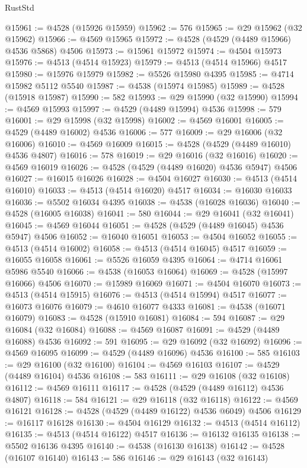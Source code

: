 \begin{lexlean}{RustStd}
\begin{coremodule}
@15961 := @4528 (@15926 @15959)
@15962 := 576
@15965 := @29 @15962 (@32 @15962)
@15966 := @4569 @15965
@15972 := @4528 (@4529 (@4489 @15966) @4536 @5868) @4506
@15973 := @15961 @15972
@15974 := @4504 @15973
@15976 := @4513 (@4514 @15923)
@15979 := @4513 (@4514 @15966) @4517
@15980 := @15976 @15979
@15982 := @5526 @15980 @4395
@15985 := @4714 @15982 @5112 @5540
@15987 := @4538 (@15974 @15985)
@15989 := @4528 (@15918 @15987)
@15990 := 582
@15993 := @29 @15990 (@32 @15990)
@15994 := @4569 @15993
@15997 := @4529 (@4489 @15994) @4536
@15998 := 579
@16001 := @29 @15998 (@32 @15998)
@16002 := @4569 @16001
@16005 := @4529 (@4489 @16002) @4536
@16006 := 577
@16009 := @29 @16006 (@32 @16006)
@16010 := @4569 @16009
@16015 := @4528 (@4529 (@4489 @16010) @4536 @4807)
@16016 := 578
@16019 := @29 @16016 (@32 @16016)
@16020 := @4569 @16019
@16026 := @4528 (@4529 (@4489 @16020) @4536 @5947) @4506
@16027 := @16015 @16026
@16028 := @4504 @16027
@16030 := @4513 (@4514 @16010)
@16033 := @4513 (@4514 @16020) @4517
@16034 := @16030 @16033
@16036 := @5502 @16034 @4395
@16038 := @4538 (@16028 @16036)
@16040 := @4528 (@16005 @16038)
@16041 := 580
@16044 := @29 @16041 (@32 @16041)
@16045 := @4569 @16044
@16051 := @4528 (@4529 (@4489 @16045) @4536 @5947) @4506
@16052 := @16040 @16051
@16053 := @4504 @16052
@16055 := @4513 (@4514 @16002)
@16058 := @4513 (@4514 @16045) @4517
@16059 := @16055 @16058
@16061 := @5526 @16059 @4395
@16064 := @4714 @16061 @5986 @5540
@16066 := @4538 (@16053 @16064)
@16069 := @4528 (@15997 @16066) @4506
@16070 := @15989 @16069
@16071 := @4504 @16070
@16073 := @4513 (@4514 @15915)
@16076 := @4513 (@4514 @15994) @4517
@16077 := @16073 @16076
@16079 := @4610 @16077 @4333
@16081 := @4538 (@16071 @16079)
@16083 := @4528 (@15910 @16081)
@16084 := 594
@16087 := @29 @16084 (@32 @16084)
@16088 := @4569 @16087
@16091 := @4529 (@4489 @16088) @4536
@16092 := 591
@16095 := @29 @16092 (@32 @16092)
@16096 := @4569 @16095
@16099 := @4529 (@4489 @16096) @4536
@16100 := 585
@16103 := @29 @16100 (@32 @16100)
@16104 := @4569 @16103
@16107 := @4529 (@4489 @16104) @4536
@16108 := 583
@16111 := @29 @16108 (@32 @16108)
@16112 := @4569 @16111
@16117 := @4528 (@4529 (@4489 @16112) @4536 @4807)
@16118 := 584
@16121 := @29 @16118 (@32 @16118)
@16122 := @4569 @16121
@16128 := @4528 (@4529 (@4489 @16122) @4536 @6049) @4506
@16129 := @16117 @16128
@16130 := @4504 @16129
@16132 := @4513 (@4514 @16112)
@16135 := @4513 (@4514 @16122) @4517
@16136 := @16132 @16135
@16138 := @5502 @16136 @4395
@16140 := @4538 (@16130 @16138)
@16142 := @4528 (@16107 @16140)
@16143 := 586
@16146 := @29 @16143 (@32 @16143)

\end{coremodule}
\end{lexlean}
